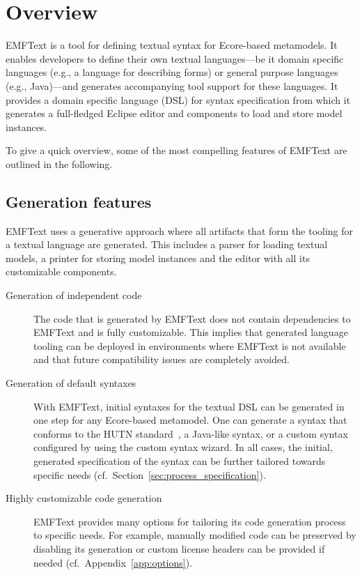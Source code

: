 \chapter{Overview}
EMFText is a tool for defining textual syntax for Ecore-based metamodels. It 
enables developers to define their own textual languages---be it domain
specific languages (e.g., a language for describing forms) or general purpose 
languages (e.g., Java)---and generates accompanying tool support for these 
languages. It provides a domain specific language (DSL) for syntax 
specification from which it generates a full-fledged Eclipse editor and 
components to load and store model instances.

To give a quick overview, some of the most compelling features of EMFText are 
outlined in the following.

\section{Generation features}
EMFText uses a generative approach where all artifacts that form the tooling for
a textual language are generated. This includes a parser for loading textual 
models, a printer for storing model instances and the editor with all its
customizable components.

\begin{description}

  \item[Generation of independent code]
        The code that is generated by EMFText does not contain dependencies
        to EMFText and is fully customizable. This implies that generated 
        language tooling can be deployed in environments where EMFText is not 
        available and that future compatibility issues are completely avoided.

  \item[Generation of default syntaxes]
        With EMFText, initial syntaxes for the textual DSL can be generated 
        in one step for any Ecore-based metamodel. One can generate a syntax 
        that conforms to the HUTN standard~\cite{HUTN}, a Java-like syntax, or
        a custom syntax configured by using the custom syntax wizard. In all 
        cases, the initial, generated specification of the syntax can be further 
        tailored towards specific needs 
        (cf.~Section~\ref{sec:process_specification}).
        
  \item[Highly customizable code generation]
        EMFText provides many options for tailoring its code generation process
        to specific needs. For example, manually modified code can be preserved
        by disabling its generation or custom license headers can be provided 
        if needed (cf.~Appendix~\ref{app:options}).

\end{description}



